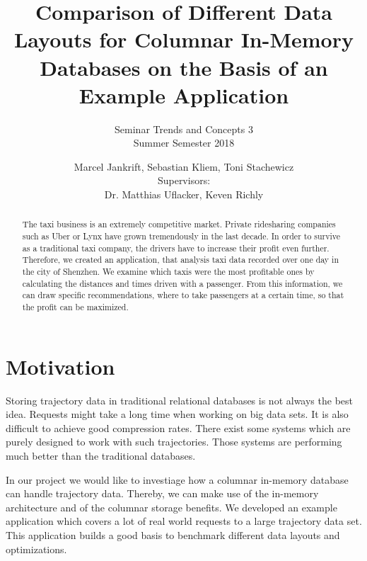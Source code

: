 \documentclass[10pt]{sig-alternate}
\begin{document}

\title{
  \vspace{24pt}
  Comparison of Different Data Layouts for Columnar In-Memory Databases on the Basis of an Example Application
}
\subtitle{
  Seminar Trends and Concepts 3\\
  Summer Semester 2018
}


\author{
  Marcel Jankrift, Sebastian Kliem, Toni Stachewicz\\[12pt]
  Supervisors:\\
  Dr. Matthias Uflacker, Keven Richly
}


\maketitle
\begin{abstract}
The taxi business is an extremely competitive market. Private ridesharing companies such as Uber or Lynx have grown tremendously in the last decade. In order to survive as a traditional taxi company, the drivers have to increase their profit even further. Therefore, we created an application, that analysis taxi data recorded over one day in the city of Shenzhen. We examine which taxis were the most profitable ones by calculating the distances and times driven with a passenger. From this information, we can draw specific recommendations, where to take passengers at a certain time, so that the profit can be maximized.
\end{abstract}


\section{Motivation}

Storing trajectory data in traditional relational databases is not always the best idea. Requests might take a long time when working on big data sets. It is also difficult to achieve good compression rates. There exist some systems which are purely designed to work with such trajectories. Those systems are performing much better than the traditional databases.

In our project we would like to investiage how a columnar in-memory database can handle trajectory data. Thereby, we can make use of the in-memory architecture and of the columnar storage benefits. We developed an example application which covers a lot of real world requests to a large trajectory data set. This application builds a good basis to benchmark different data layouts and optimizations.
\end{document}

